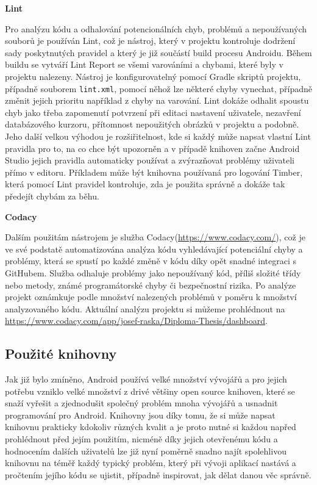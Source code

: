 \documentclass{article}
\begin{document}
\noindent
 \textbf{Lint}


 Pro analýzu kódu a odhalování potencionálních chyb, problémů a nepoužívaných souborů je používán Lint,
  což je nástroj, který v projektu kontroluje dodržení sady poskytnutých pravidel a který
  je již součástí build procesu Androidu. Během buildu se vytváří Lint Report
  se všemi varováními a chybami, které byly v projektu nalezeny. Nástroj je konfigurovatelný pomocí
  Gradle skriptů projektu, případně souborem \texttt{lint.xml}, pomocí něhož lze některé chyby
  vynechat, případně změnit jejich prioritu například z chyby na varování.
  Lint dokáže odhalit spoustu chyb jako třeba zapomenutí potvrzení při editaci nastavení uživatele,
  nezavření databázového kurzoru, přítomnost nepoužitých obrázků v projektu a podobně.
  Jeho další velkou výhodou je rozšiřitelnost, kde si každý může napsat vlastní Lint pravidla pro to, na co chce být upozorněn
  a v případě knihoven začne Android Studio jejich pravidla automaticky používat a zvýrazňovat problémy uživateli
  přímo v editoru.
  Příkladem může být knihovna používaná pro logování Timber, která pomocí Lint pravidel
  kontroluje, zda je použita správně a dokáže tak předejít chybám za běhu.

\noindent
\textbf{Codacy}


Dalším použitám nástrojem je služba Codacy(\url{https://www.codacy.com/}), což je ve své podstatě
automatizována analýza kódu vyhledávající potenciální chyby a problémy, která se spustí po každé změně v kódu
díky opět snadné integraci s GitHubem. Služba odhaluje problémy jako nepoužívaný kód, příliš složité
třídy nebo metody, známé programátorské chyby či bezpečnostní rizika. Po analýze projekt oznámkuje podle
množství nalezených problémů v poměru k množství analyzovaného kódu. Aktuální analýzu projektu si můžeme prohlédnout
na \url{https://www.codacy.com/app/josef-raska/Diploma-Thesis/dashboard}.

\subsection{Použité knihovny}
Jak již bylo zmíněno, Android používá velké množství vývojářů a pro jejich potřebu vzniklo velké množství
z drivé většiny open source knihoven, které se snaží vyřešit a zjednodušit společný problém mnoha vývojářů
a usnadnit programování pro Android. Knihovny jsou díky tomu, že si může napsat knihovnu prakticky kdokoliv
různých kvalit a je proto nutné si každou napřed prohlédnout před jejím použitím, nicméně díky jejich
otevřenému kódu a hodnocením dalších uživatelů lze již nyní poměrně snadno najít spolehlivou knihovnu na téměř každý
typický problém, který při vývoji aplikací nastává a pročtením jejího kódu se ujistit, případně inspirovat,
jak dělat danou věc správně.
\end{document}
